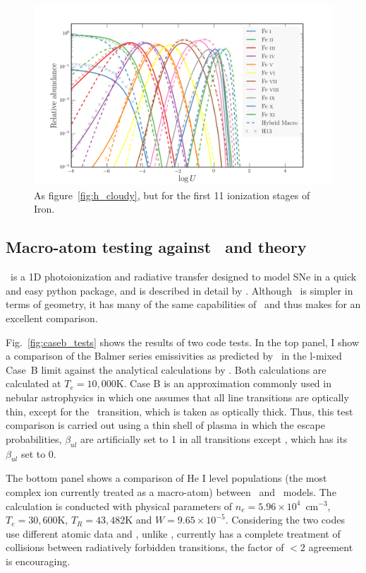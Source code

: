 \begin{figure}
\centering
\includegraphics[width=1.0\textwidth]{figures/03-radtrans/ir_comp.png}
\caption
{
As figure~\ref{fig:h_cloudy}, but for the first 11 ionization stages of Iron.
}
\label{fig:ir_cloudy}
\end{figure}



\subsection{Macro-atom testing against \tar\ and theory}

\tar\ is a 1D photoionization and radiative transfer designed to
model SNe in a quick and easy python package, and is described in detail by
\cite{kerzendorfsim}. Although \tar\ is simpler in terms
of geometry, it has many of the same capabilities of \py\ and 
thus makes for an excellent comparison. 

Fig.~\ref{fig:caseb_tests} shows the results of two code tests. 
In the top panel, I show a comparison of the Balmer series 
emissivities as predicted by \py\ in the l-mixed Case~B limit against the
analytical calculations by \cite{seaton1959}. 
Both calculations are calculated at $T_e=10,000$K.
Case B is an approximation commonly used in nebular astrophysics 
\citep[see e.g.][]{osterbrock} in which
one assumes that all line transitions are optically thin, except
for the \la\ transition, which is taken as optically thick.
Thus, this test comparison is carried out using a thin shell
of plasma in which the escape probabilities, $\beta_{ul}$ 
are artificially set to 1 in all transitions except \la, which
has its $\beta_{ul}$ set to 0.

The bottom panel shows a comparison of He I level populations 
(the most complex ion currently 
treated as a macro-atom) between \py\ and \tar\ models.
The calculation is conducted with physical parameters of $n_e=5.96\times10^4$~cm$^{-3}$,
$T_e=30,600$K, $T_R=43,482$K and $W=9.65\times10^{-5}$. 
Considering the two codes use different atomic data and 
\tar, unlike \py, currently has a 
complete treatment of collisions between 
radiatively forbidden transitions, the factor of 
$<2$ agreement is encouraging. 

